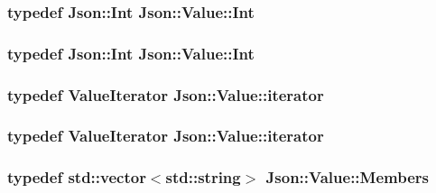 \hypertarget{classJson_1_1Value_abdf7a7ff73eb130ffcab28504ffdb405}{
\subsubsection[{Int}]{\setlength{\rightskip}{0pt plus 5cm}typedef {\bf Json\-::\-Int} {\bf Json\-::\-Value\-::\-Int}}}\label{d1/db8/classJson_1_1Value_abdf7a7ff73eb130ffcab28504ffdb405}
\hypertarget{classJson_1_1Value_abdf7a7ff73eb130ffcab28504ffdb405}{
\subsubsection[{Int}]{\setlength{\rightskip}{0pt plus 5cm}typedef {\bf Json\-::\-Int} {\bf Json\-::\-Value\-::\-Int}}}\label{d1/db8/classJson_1_1Value_abdf7a7ff73eb130ffcab28504ffdb405}
\hypertarget{classJson_1_1Value_a341cdf2e01f8b3c5b7317aa2f0768c53}{
\subsubsection[{iterator}]{\setlength{\rightskip}{0pt plus 5cm}typedef {\bf Value\-Iterator} {\bf Json\-::\-Value\-::iterator}}}\label{d1/db8/classJson_1_1Value_a341cdf2e01f8b3c5b7317aa2f0768c53}
\hypertarget{classJson_1_1Value_a341cdf2e01f8b3c5b7317aa2f0768c53}{
\subsubsection[{iterator}]{\setlength{\rightskip}{0pt plus 5cm}typedef {\bf Value\-Iterator} {\bf Json\-::\-Value\-::iterator}}}\label{d1/db8/classJson_1_1Value_a341cdf2e01f8b3c5b7317aa2f0768c53}
\hypertarget{classJson_1_1Value_ac61bab5a465848b57610379cc07995c3}{
\subsubsection[{Members}]{\setlength{\rightskip}{0pt plus 5cm}typedef std\-::vector$<$std\-::string$>$ {\bf Json\-::\-Value\-::\-Members}}}\label{d1/db8/classJson_1_1Value_ac61bab5a465848b57610379cc07995c3}
